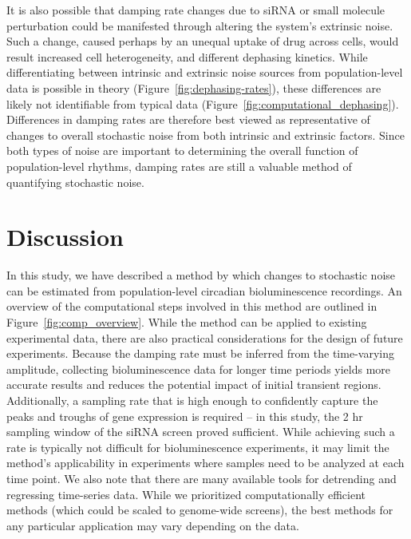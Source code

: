\documentclass[11pt, letterpaper]{article}
\begin{document}
It is also possible that damping rate changes due to siRNA or small molecule perturbation could be manifested through altering the system's extrinsic noise.
Such a change, caused perhaps by an unequal uptake of drug across cells, would result increased cell heterogeneity, and different dephasing kinetics.
While differentiating between intrinsic and extrinsic noise sources from population-level data is possible in theory (Figure~\ref{fig:dephasing-rates}), these differences are likely not identifiable from typical data (Figure~\ref{fig:computational_dephasing}).
Differences in damping rates are therefore best viewed as representative of changes to overall stochastic noise from both intrinsic and extrinsic factors.
Since both types of noise are important to determining the overall function of population-level rhythms, damping rates are still a valuable method of quantifying stochastic noise.


\section*{Discussion}

In this study, we have described a method by which changes to stochastic noise can be estimated from population-level circadian bioluminescence recordings.
An overview of the computational steps involved in this method are outlined in Figure~\ref{fig:comp_overview}.
While the method can be applied to existing experimental data, there are also practical considerations for the design of future experiments.
Because the damping rate must be inferred from the time-varying amplitude, collecting bioluminescence data for longer time periods yields more accurate results and reduces the potential impact of initial transient regions.
Additionally, a sampling rate that is high enough to confidently capture the peaks and troughs of gene expression is required -- in this study, the 2 hr sampling window of the siRNA screen proved sufficient.
While achieving such a rate is typically not difficult for bioluminescence experiments, it may limit the method's applicability in experiments where samples need to be analyzed at each time point.
We also note that there are many available tools for detrending and regressing time-series data.
While we prioritized computationally efficient methods (which could be scaled to genome-wide screens), the best methods for any particular application may vary depending on the data.
\end{document}
